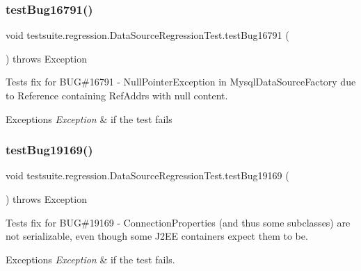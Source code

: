 \subsubsection{\texorpdfstring{test\+Bug16791()}{testBug16791()}}
{\footnotesize\ttfamily void testsuite.\+regression.\+Data\+Source\+Regression\+Test.\+test\+Bug16791 (\begin{DoxyParamCaption}{ }\end{DoxyParamCaption}) throws Exception}

Tests fix for B\+UG\#16791 -\/ Null\+Pointer\+Exception in Mysql\+Data\+Source\+Factory due to Reference containing Ref\+Addrs with null content.


\begin{DoxyExceptions}{Exceptions}
{\em Exception} & if the test fails \\
\hline
\end{DoxyExceptions}
\mbox{\label{classtestsuite_1_1regression_1_1_data_source_regression_test_a9ef6137b8f62a30be45c74a81be1d299}} 
\subsubsection{\texorpdfstring{test\+Bug19169()}{testBug19169()}}
{\footnotesize\ttfamily void testsuite.\+regression.\+Data\+Source\+Regression\+Test.\+test\+Bug19169 (\begin{DoxyParamCaption}{ }\end{DoxyParamCaption}) throws Exception}

Tests fix for B\+UG\#19169 -\/ Connection\+Properties (and thus some subclasses) are not serializable, even though some J2\+EE containers expect them to be.


\begin{DoxyExceptions}{Exceptions}
{\em Exception} & if the test fails. \\
\hline
\end{DoxyExceptions}
\mbox{\label{classtestsuite_1_1regression_1_1_data_source_regression_test_a59191cb9aeb387f68d1d484356d9c744}} 
